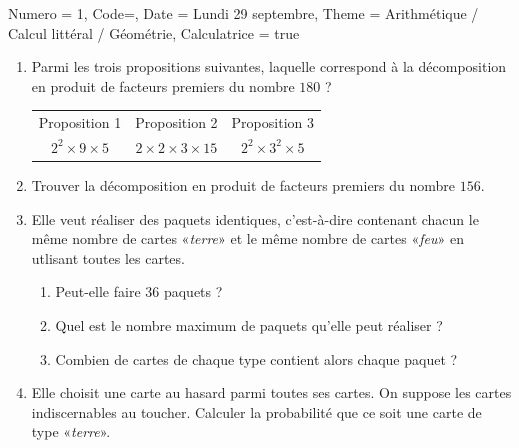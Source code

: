 \documentclass[11pt]{article}
\begin{document}
\begin{Maquette}[IE]{
        Numero = 1, Code={}, Date = Lundi 29 septembre, Theme = Arithmétique / Calcul littéral / Géométrie, Calculatrice = true
    }
\begin{exercice}
        \begin{enumerate}[itemsep=1em]
            \item Parmi les trois propositions suivantes, laquelle correspond à la décomposition en produit de facteurs premiers du nombre $180$ ?
                  \begin{center}
                      \renewcommand{\arraystretch}{1.2}
                      \begin{tabular}{|*{3}{c|}}
                          \hline
                          Proposition 1       & Proposition 2             & Proposition 3         \\
                          $2^2\times9\times5$ & $2\times2\times3\times15$ & $2^2\times3^2\times5$ \\
                          \hline
                      \end{tabular}
                  \end{center}
            \item Trouver la décomposition en produit de facteurs premiers du nombre $156$.
            \item Elle veut réaliser des paquets identiques, c'est-à-dire contenant chacun le même nombre de cartes «\emph{terre}»  et le même nombre de cartes «\emph{feu}»  en utlisant toutes les cartes.
                  \begin{enumerate}[label=\textbf{\alph*.}]
                      \item Peut-elle faire $36$ paquets ?
                      \item Quel est le nombre maximum de paquets qu'elle peut réaliser ?
                      \item Combien de cartes de chaque type contient alors chaque paquet ?
                  \end{enumerate}
            \item Elle choisit une carte au hasard parmi toutes ses cartes. On suppose les cartes indiscernables au toucher. Calculer la probabilité que ce soit une carte de type «\emph{terre}».
        \end{enumerate}
    \end{exercice}


\end{Maquette}
\end{document}
